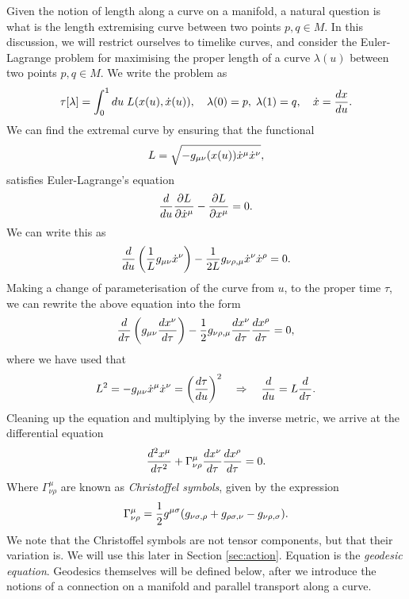 Given the notion of length along a curve on a manifold, a natural question is what is the length extremising curve between two points ${p,q} \in M$. In this discussion, we will restrict ourselves to timelike curves, and consider the Euler-Lagrange problem for maximising the proper length of a curve $\lambda(u)$ between two points $p,q \in M$. We write the problem as
\begin{equation*}
	\tau[\lambda] = \int_0^1 du \; L(x(u), \dot{x}(u)), \quad \lambda(0) = p, \; \lambda(1) = q, \quad \dot{x} = \frac{d x}{d u}.  
\end{equation*}
We can find the extremal curve by ensuring that the functional 
\begin{equation*}
	L = \sqrt{- {g_{\mu\nu}}(x(u)) \dot{x}^\mu \dot{x}^\nu} ,
\end{equation*}
satisfies Euler-Lagrange's equation
\begin{equation*}
  \frac{d }{d u} \frac{\partial L}{\partial \dot{x}^\mu} - \frac{\partial L}{\partial x^\mu} = 0.
\end{equation*}
We can write this as
\begin{equation*}
  \frac{d }{d u} \left( \frac{1}{L } g_{\mu \nu} \dot{x}^\nu \right) - \frac{1}{2 L } g_{\nu \rho,\mu} \dot{x}^\nu \dot{x}^\rho = 0.
\end{equation*}
Making a change of parameterisation of the curve from $u$, to the proper time $\tau$, we can rewrite the above equation into the form
\begin{equation*}
  \frac{d }{d \tau} \left( g_{\mu \nu} \frac{d x^\nu}{d \tau} \right) - \frac{1}{2} g_{\nu \rho,\mu} \frac{d x^\nu}{d \tau} \frac{d x^\rho}{d \tau} = 0,
\end{equation*}
where we have used that
\begin{equation*}
  L^2 = - {g_{\mu\nu}} \dot{x}^\mu \dot{x}^\nu = \left(\frac{d \tau}{d u} \right)^2 \quad \Rightarrow \quad \frac{d }{d u} = L \frac{d }{d \tau}.
\end{equation*}
Cleaning up the equation and multiplying by the inverse metric, we arrive at the differential equation
\begin{equation}
\label{eq:geodesic}
	\frac{d ^2 x^\mu}{d \tau^2} + \Gamma^\mu_{\nu \rho} \frac{d x^\nu}{d \tau} \frac{d x^\rho}{d \tau} = 0.
\end{equation}
Where $\Gamma^{\mu}_{\nu \rho}$ are known as \emph{Christoffel symbols}, given by the expression
\begin{equation}
\label{eq:chs}
   \Gamma^\mu_{\nu \rho} = \frac{1}{2} g^{\mu \sigma} (g_{\nu \sigma,\rho} + g_{\rho \sigma,\nu} - g_{\nu \rho,\sigma}).
\end{equation}
We note that the Christoffel symbols are not tensor components, but that their variation is. We will use this later in Section \ref{sec:action}. Equation  is the \emph{geodesic equation}. Geodesics themselves will be defined below, after we introduce the notions of a connection on a manifold and parallel transport along a curve.
 

